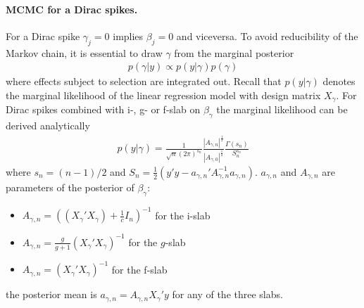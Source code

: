 \documentclass[11 pt]{article}
\begin{document}
\begin{multicols}{2}
\paragraph{MCMC for a Dirac spikes.} For a Dirac spike $\gamma_j = 0$ implies $\beta_j = 0$ and viceversa. To avoid reducibility of the Markov chain, it is essential to draw $\gamma$ from the marginal posterior
\begin{align*}
    p(\gamma|y) \propto p(y|\gamma)p(\gamma) 
\end{align*}
where effects subject to selection are integrated out. Recall that $p(y|\gamma)$ denotes the marginal likelihood of the linear regression model with design matrix $X_\gamma$. For Dirac spikes combined with i-, g- or f-slab on $\beta_\gamma$ the marginal likelihood can be derived analytically
\begin{align*}
    p(y|\gamma) = \frac{1}{\sqrt{n}(2\pi)^{s_n}}\frac{|A_{\gamma,n}|^{\frac{1}{2}}}{|A_{\gamma,0}|^\frac{1}{2}}\frac{\Gamma(s_n)}{S_n^{s_n}}
\end{align*}
where $s_n = (n - 1)/2$ and $S_n = \frac{1}{2}(y'y - a_{\gamma,n}'A_{\gamma,n}^{-1}a_{\gamma,n})$. $a_{\gamma,n}$ and $A_{\gamma,n}$ are parameters of the posterior of $\beta_\gamma$:
\begin{itemize}
    \item $A_{\gamma,n}=((X_\gamma'X_\gamma) + \frac{1}{c}I_n)^{-1}$ for the i-slab
    \item $A_{\gamma,n} = \frac{g}{g+1}(X_\gamma'X_\gamma)^{-1}$ for the $g$-slab
    \item $A_{\gamma,n} = (X_\gamma'X_\gamma)^{-1}$ for the f-slab
\end{itemize}
the posterior mean is $a_{\gamma,n} = A_{\gamma,n}X_\gamma'y$ for any of the three slabs. 


\end{multicols}
\end{document}
